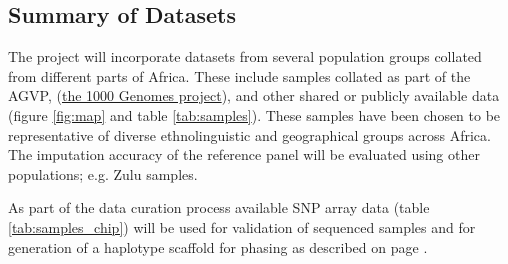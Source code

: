 \subsection{Summary of Datasets}
The project will incorporate datasets from several population groups collated from different parts of Africa. These include samples collated as part of the AGVP\cite{Gurdasani2015}, (\href{http://www.1000genomes.org}{the 1000 Genomes project})\cite{1000G2012},
 and other shared or publicly available data (figure \ref{fig:map} and table \ref{tab:samples}). These samples have been chosen to be representative of diverse ethnolinguistic and geographical groups across Africa. The imputation accuracy of the reference panel will be evaluated using other populations; e.g. Zulu samples.
 
 As part of the data curation process available SNP array data (table \ref{tab:samples_chip}) will be used for validation of sequenced samples and for generation of a haplotype scaffold for phasing as described on page \pageref{sec:refine_and_phase}.
 

